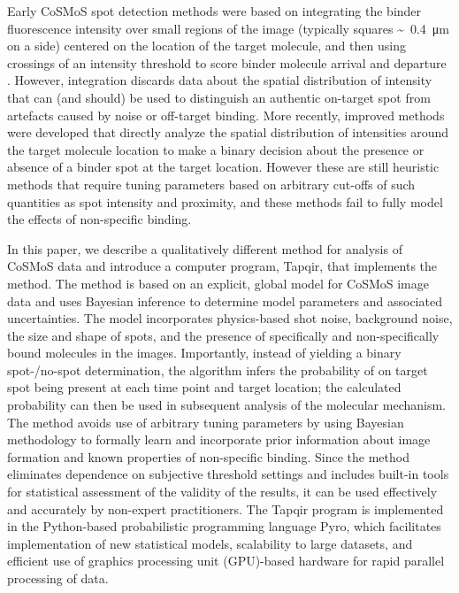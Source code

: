 Early CoSMoS spot detection methods were based on integrating the binder fluorescence intensity over small regions of the image (typically squares \SI{0.4}[\sim]{\um} on a side) centered on the location of the target molecule, and then using crossings of an intensity threshold to score binder molecule arrival and departure \cite{Friedman2015-nx}. However, integration discards data about the spatial distribution of intensity that can (and should) be used to distinguish an  authentic on-target spot from artefacts caused by noise or off-target binding.  More recently, improved methods \cite{Friedman2015-nx,Smith2019-yb} were developed that directly analyze the spatial distribution of intensities around the target molecule location to make a binary decision about the presence or absence of a binder spot at the target location.  However these are still heuristic methods that require tuning parameters based on arbitrary cut-offs of such quantities as spot intensity and proximity, and these methods fail to fully model the effects of non-specific binding.

In this paper, we describe a qualitatively different method for analysis of CoSMoS data and introduce a computer program, Tapqir, that implements the method. The method is based on an explicit, global model for CoSMoS image data and uses Bayesian inference to determine model parameters and associated uncertainties. The model incorporates physics-based shot noise, background noise, the size and shape of spots, and the presence of specifically and non-specifically bound molecules in the images. Importantly, instead of yielding a binary spot-/no-spot determination, the algorithm infers the probability of on target spot being present at each time point and target location; the calculated probability can then be used in subsequent analysis of the molecular mechanism. The method avoids use of arbitrary tuning parameters by using Bayesian methodology to formally learn and incorporate prior information about image formation and known properties of non-specific binding.  Since the method eliminates dependence on subjective threshold settings and includes built-in tools for statistical assessment of the validity of the results, it can be used effectively and accurately by non-expert practitioners. The Tapqir program is implemented in the Python-based probabilistic programming language Pyro, which facilitates implementation of new statistical models, scalability to large datasets, and efficient use of graphics processing unit (GPU)-based hardware for rapid parallel processing of data. 